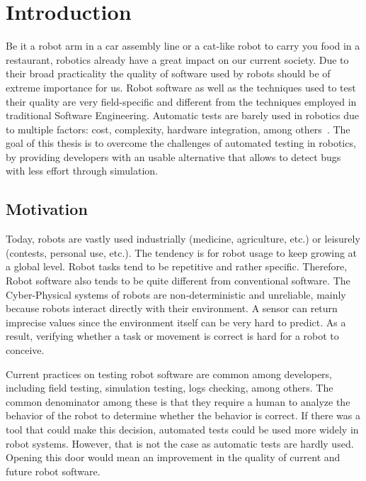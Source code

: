 \chapter{Introduction}
\label{chap:introduction}

Be it a robot arm in a car assembly line or a cat-like robot to carry you food 
in a restaurant, robotics already have a great impact on our current society. 
Due to their broad practicality the quality of software 
used by robots should be of extreme importance for us.
Robot software as well as the techniques used to test their quality are very 
field-specific and different from the techniques employed in traditional Software Engineering.
Automatic tests are barely used in robotics due to multiple factors:
cost, complexity, hardware integration, among others~\cite{TestRob}.
The goal of this thesis is to overcome the challenges of automated 
testing in robotics, by providing developers with an usable alternative 
that allows to detect bugs with less effort through simulation.


\section{Motivation}
\label{sec:motivation}

Today, robots are vastly used industrially (medicine, agriculture, etc.) 
or leisurely (contests, personal use, etc.).
The tendency is for robot usage to keep growing at a global level.
Robot tasks tend to be repetitive and rather specific.
Therefore, Robot software also tends to be quite different from conventional software.
The Cyber-Physical systems of robots are non-deterministic and unreliable, 
mainly because robots interact directly with their environment.
A sensor can return imprecise values since the environment itself can be very hard to predict.
As a result, verifying whether a task or movement is correct is hard for a robot to conceive.

\par

Current practices on testing robot software are common among developers, 
including field testing, simulation testing, logs checking, among others.
The common denominator among these is that they require a human to analyze 
the behavior of the robot to determine whether the behavior is correct. 
If there was a tool that could make this decision, automated tests 
could be used more widely in robot systems.
However, that is not the case as automatic tests are hardly used. 
Opening this door would mean an improvement in the 
quality of current and future robot software.



